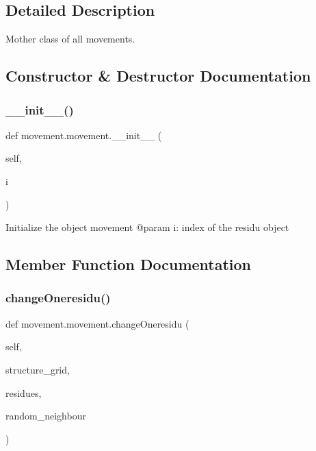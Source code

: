 \subsection{Detailed Description}
\begin{DoxyVerb}Mother class of all movements.
\end{DoxyVerb}
 

\subsection{Constructor \& Destructor Documentation}
\mbox{\label{classmovement_1_1movement_acf4e8b0e3c24c68bde44e1d66820dc41}} 
\subsubsection{\texorpdfstring{\+\_\+\+\_\+init\+\_\+\+\_\+()}{\_\_init\_\_()}}
{\footnotesize\ttfamily def movement.\+movement.\+\_\+\+\_\+init\+\_\+\+\_\+ (\begin{DoxyParamCaption}\item[{}]{self,  }\item[{}]{i }\end{DoxyParamCaption})}

\begin{DoxyVerb}Initialize the object movement
    @param   i: index of the residu object
\end{DoxyVerb}
 

\subsection{Member Function Documentation}
\mbox{\label{classmovement_1_1movement_a6d04cb00a64e07aa940a60b726c4f435}} 
\subsubsection{\texorpdfstring{change\+Oneresidu()}{changeOneresidu()}}
{\footnotesize\ttfamily def movement.\+movement.\+change\+Oneresidu (\begin{DoxyParamCaption}\item[{}]{self,  }\item[{}]{structure\+\_\+grid,  }\item[{}]{residues,  }\item[{}]{random\+\_\+neighbour }\end{DoxyParamCaption})}

